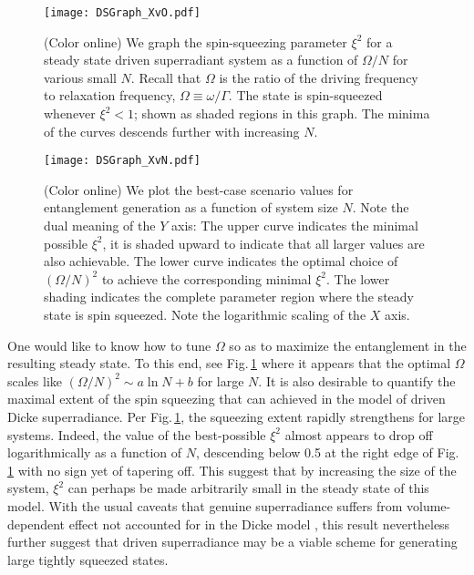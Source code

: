 \documentclass[
  12pt          %
  ,letterpaper  %
  ,center       %
  ,noupper      %
  ,english,fleqn]{uconnthesis}
\newcommand{\fig}[1]{Fig.\,\ref{#1}}
\begin{document}
\begin{figure}[ht]
\centering
\texttt{[image: DSGraph\_XvO.pdf]}
\caption{(Color online) We graph  the spin-squeezing parameter $\xi^2$ for a steady state driven superradiant system as a function of $\Omega/N$ for various small $N$. Recall that $\Omega$ is the ratio of the driving frequency to relaxation frequency, $\Omega \equiv \omega/\Gamma$. The state is spin-squeezed whenever $\xi^2<1$; shown as shaded regions in this graph. The minima of the curves descends further with increasing $N$.}\label{fig:figXvO}
\vspace{2.8pt}
\texttt{[image: DSGraph\_XvN.pdf]}
\caption{(Color online) We plot the best-case scenario values for entanglement generation as a function of system size $N$. Note the dual meaning of the $Y$ axis: The upper curve indicates the minimal possible $\xi^2$, it is shaded upward to indicate that all larger values are also achievable. The lower curve indicates the optimal choice of $(\Omega/N)^2$ to achieve the corresponding minimal $\xi^2$. The lower shading indicates the complete parameter region where the steady state is spin squeezed. Note the logarithmic scaling of the $X$ axis.} %
\label{fig:figXvN}
\end{figure}

One would like to know how to tune $\Omega$ so as to maximize the entanglement in the resulting steady state. To this end, see \fig{fig:figXvN} where it appears that the optimal $\Omega$ scales like $(\Omega/N)^2 \sim a \ln{N}+b$ for large $N$. It is also desirable to quantify the maximal extent of the spin squeezing that can achieved in the model of driven Dicke superradiance. Per \fig{fig:figXvN}, the squeezing extent rapidly strengthens for large systems. Indeed, the value of the best-possible $\xi^2$ almost appears to drop off logarithmically as a function of $N$, descending below 0.5 at the right edge of \fig{fig:figXvN} with no sign yet of tapering off. This suggest that by increasing the size of the system, $\xi^2$ can perhaps be made arbitrarily small in the steady state of this model. With the usual caveats that genuine superradiance suffers from volume-dependent effect not accounted for in the Dicke model \cite{superrad.yelinPRA,superrad.yelinBook}, this result nevertheless further suggest that driven superradiance may be a viable scheme for generating large tightly squeezed states.
\end{document}
